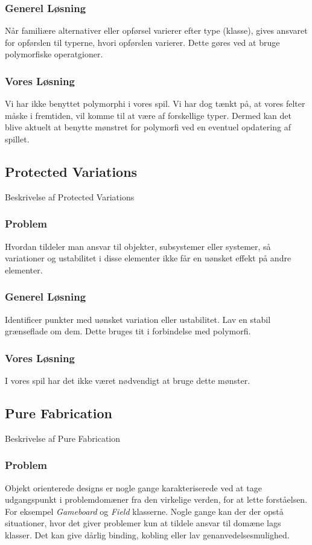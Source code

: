 \subsubsection*{Generel Løsning}
Når familiære alternativer eller opførsel varierer efter type (klasse), gives ansvaret for opførslen til typerne, hvori opførslen varierer. Dette gøres ved at bruge polymorfiske operatgioner.
\subsubsection*{Vores Løsning}
Vi har ikke benyttet polymorphi i vores spil. Vi har dog tænkt på, at vores felter måske i fremtiden, vil komme til at være af forskellige typer. Dermed kan det blive aktuelt at benytte mønstret for polymorfi ved en eventuel opdatering af spillet.
\subsection{Protected Variations}
Beskrivelse af Protected Variations
\subsubsection*{Problem}
Hvordan tildeler man ansvar til objekter, subsystemer eller systemer, så variationer og ustabilitet i disse elementer ikke får en uønsket effekt på andre elementer.
\subsubsection*{Generel Løsning}
Identificer punkter med uønsket variation eller ustabilitet. Lav en stabil grænseflade om dem. Dette bruges tit i forbindelse med polymorfi.
\subsubsection*{Vores Løsning}
I vores spil har det ikke været nødvendigt at bruge dette mønster.
\subsection{Pure Fabrication}
Beskrivelse af Pure Fabrication
\subsubsection*{Problem}
Objekt orienterede designs er nogle gange karakteriserede ved at tage udgangspunkt i problemdomæner fra den virkelige verden, for at lette forståelsen. For eksempel \textit{Gameboard} og \textit{Field} klasserne. Nogle gange kan der der opstå situationer, hvor det giver problemer kun at tildele ansvar til domæne lags klasser. Det kan give dårlig binding, kobling eller lav genanvedelsesmulighed.
